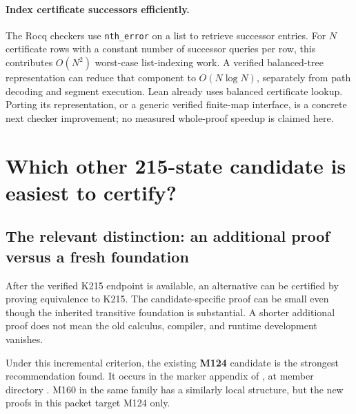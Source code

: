 \documentclass[11pt]{article}
\theoremstyle{remark}\newtheorem{remark}[theorem]{Remark}
\newcommand{\code}[1]{\texttt{\small #1}}
\begin{document}
\paragraph{Index certificate successors efficiently.}
The Rocq checkers use \code{nth\_error} on a list to retrieve successor entries. For $N$ certificate rows with a constant number of successor queries per row, this contributes $O(N^2)$ worst-case list-indexing work. A verified balanced-tree representation can reduce that component to $O(N\log N)$, separately from path decoding and segment execution. Lean already uses balanced certificate lookup. Porting its representation, or a generic verified finite-map interface, is a concrete next checker improvement; no measured whole-proof speedup is claimed here.

\section{Which other 215-state candidate is easiest to certify?}

\subsection{The relevant distinction: an additional proof versus a fresh foundation}

After the verified K215 endpoint is available, an alternative can be certified by proving equivalence to K215. The candidate-specific proof can be small even though the inherited transitive foundation is substantial. A shorter additional proof does not mean the old calculus, compiler, and runtime development vanishes.

Under this incremental criterion, the existing \textbf{M124} candidate is the strongest recommendation found. It occurs in the marker appendix of
, at member directory
 \cite{dr215}. M160 in the same family has a similarly local structure, but the new proofs in this packet target M124 only.
\end{document}
